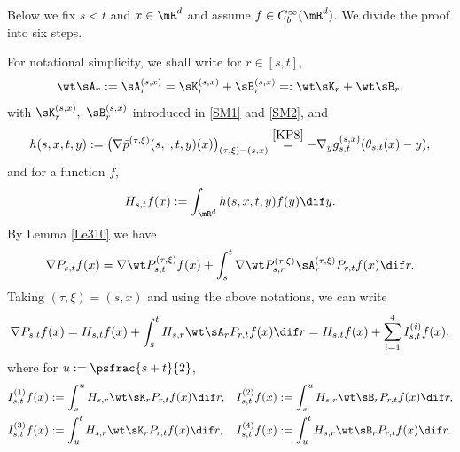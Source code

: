 Below we fix $s<t$ and $x\in\mR^d$ and assume $f\in C^\infty_b(\mR^d)$. We divide the proof into six steps.

\step\label{Step 1}
For notational simplicity, we shall write for $r\in[s,t]$,\vspace*{-3pt}
\[
\wt\sA_r:=\sA^{(s,x)}_r=\sK^{(s,x)}_r+\sB^{(s,x)}_r=:\wt\sK_r+\wt\sB_r,
\]
{with $\sK^{(s,x)}_r,\ \sB^{(s,x)}_r $ introduced
in \eqref{SM1} and \eqref{SM2},}
and\vspace*{-3pt}
\begin{equation}
h(s,x,t,y):=\bigl(\nabla\tilde p^{(\tau,\xi)}(s,\cdot,t,y)(x)\bigr)_{(\tau,\xi)=(s,x)}
\stackrel{\eqref{KP8}}{=}-\nabla_{y} g^{(s,x)}_{s,t}(\theta_{s,t}(x)-y),\label{HF1}
\end{equation}
and for a function $f$,\vspace*{-3pt}
\[
H_{s,t}f(x):=\int_{\mR^d}h(s,x,t,y)f(y)\dif y.
\]
By Lemma \ref{Le310} we have\vspace*{-3pt}
\[
\nabla P_{s,t}f(x)=\nabla \wt P^{(\tau,\xi)}_{s,t}f(x)+\int^t_s\nabla \wt P^{(\tau,\xi)}_{s,r}\sA^{(\tau,\xi)}_r P_{r,t} f(x)\dif r.
\]
Taking $(\tau,\xi)=(s,x)$ and using the above notations, we can write\vspace*{-3pt}
\begin{equation}\label{AA87}
\nabla P_{s,t}f(x)=H_{s,t}f(x)+\int^t_sH_{s,r}\wt\sA_r P_{r,t} f(x)\dif r=H_{s,t}f(x)+\sum_{i=1}^4I^{(i)}_{s,t} f(x),
\end{equation}
where for $u:=\psfrac{s+t}{2}$,\vspace*{-3pt}
\begin{align*}
I^{(1)}_{s,t} f(x)&:=\int^{u} _sH_{s,r}\wt\sK_r P_{r,t}f(x)\dif r,&
I^{(2)}_{s,t} f(x)&:=\int^{u} _sH_{s,r}\wt\sB_r P_{r,t}f(x)\dif r,\\
I^{(3)}_{s,t} f(x)&:=\int^t_{u}H_{s,r}\wt\sK_r P_{r,t}f(x)\dif r,&
I^{(4)}_{s,t} f(x)&:=\int^t_{u}H_{s,r}\wt\sB_r P_{r,t}f(x)\dif r.
\end{align*}


